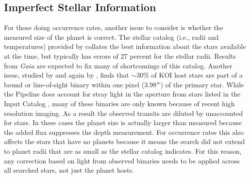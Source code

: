 \subsection{Imperfect Stellar Information}
For those doing occurrence rates, another issue to consider is whether the measured size of the planet is correct. The stellar catalog (i.e., radii and temperatures) provided by \citet{Mathur2017ApJS} collates the best information about the \Kepler{} stars available at the time, but typically has errors of 27 percent for the stellar radii. Results from \textit{Gaia} \citep{gaia2,gaia1} are expected to fix many of shortcomings of this catalog. Another issue, studied by \citet{Ciardi2015} and again by \citet{Furlan2017}, finds that $\sim$30\% of KOI host stars are part of a bound or line-of-sight binary within one \Kepler{} pixel (3.98$\mbox{$^{\prime\prime}$}$) of the primary star. While the \Kepler{} Pipeline does account for stray light in the aperture from stars listed in the \Kepler{} Input Catalog \citep{Brown2011}, many of these binaries are only known because of recent high resolution imaging. As a result the observed transits are diluted by unaccounted for stars. In these cases the planet size is actually larger than measured because the added flux suppresses the depth measurement. For occurrence rates this also affects the stars that have no planets because it means the search did not extend to planet radii that are as small as the stellar catalog indicates.  For this reason, any correction based on light from observed binaries needs to be applied across all searched stars, not just the planet hosts.



